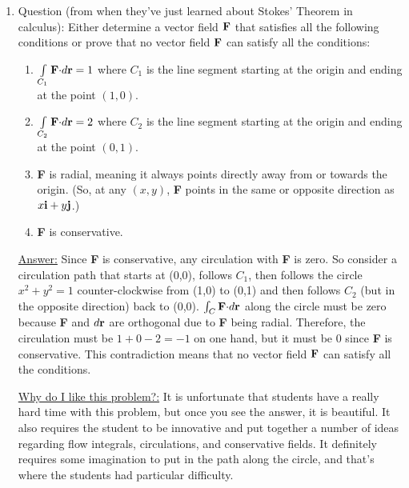 \documentclass[12pt]{article}
\begin{document}
\begin{enumerate}
\underline{Why do I like this problem?:}  Part (a) is easy, so students who know even a little should be able to answer it correctly. Part (b) is much harder and more interesting, requiring a true geometric understanding of trigonometry, along with understanding what the magnitude of a vector means. Further, just plugging in numbers will give you a mess (unless you are clever and replace ${\bf w}$ with something more simple like ${\bf i}$). 


\item Question (from when they've just learned about Stokes' Theorem in calculus):  Either determine a vector field ${\bf F}$ that satisfies all the following conditions or prove that no vector field ${\bf F}$ can satisfy all the conditions:
		\begin{enumerate}
		
		\item $\int\limits_{C_1} {\bf F \cdot} d{\bf r} =1$ where $C_1$ is the line segment starting at the origin and ending at the point $(1,0)$. 
		
		\item $\int\limits_{C_2} {\bf F \cdot} d{\bf r} =2$ where $C_2$ is the line segment starting at the origin and ending at the point $(0,1)$. 
		
		\item {\bf F} is radial, meaning it always points directly away from or towards the origin. (So, at any $(x,y)$, {\bf F} points in the same or opposite direction as $x{\bf i} + y{\bf j}$.)
		
		\item {\bf F} is conservative.
		
		\end{enumerate}

\underline{Answer:} Since {\bf F} is conservative, any circulation with {\bf F} is zero. So consider a circulation path that starts at (0,0), follows $C_1$, then follows the circle $x^2+y^2=1$ counter-clockwise from (1,0) to (0,1) and then follows $C_2$ (but in the opposite direction) back to (0,0). $\int_{C} {\bf F \cdot} d{\bf r}$ along the circle must be zero because {\bf F} and $d{\bf r}$ are orthogonal due to {\bf F} being radial. Therefore, the circulation must be $1+0-2 = -1$ on one hand, but it must be 0 since {\bf F} is conservative. This contradiction means that no vector field ${\bf F}$ can satisfy all the conditions. 

\underline{Why do I like this problem?:}  It is unfortunate that students have a really hard time with this problem, but once you see the answer, it is beautiful. It also requires the student to be innovative and put together a number of ideas regarding flow integrals, circulations, and conservative fields. It definitely requires some imagination to put in the path along the circle, and that's where the students had particular difficulty. 



\end{enumerate}
\end{document}
